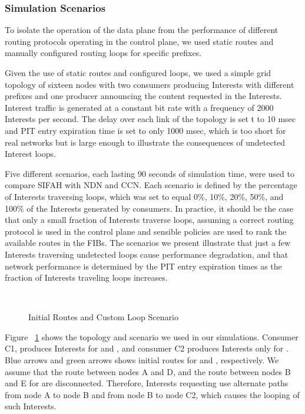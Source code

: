 \documentclass{ancs15-alternate}
\begin{document}
\subsubsection{Simulation Scenarios}

To isolate the operation of the data plane from the performance of different routing protocols operating in the control plane, we used  static routes and  manually configured routing loops for specific prefixes. 

Given the use of static routes and configured loops, we used a simple grid topology of sixteen nodes with two consumers producing Interests with different prefixes and one producer announcing the  content requested in the Interests. Interest traffic is generated at a constant bit rate with a frequency of 2000 Interests per second. The delay over each link of the topology is set t to 10 msec  and PIT entry expiration time is set to only 1000 msec, which is too short for real networks but is large enough to illustrate the consequences of undetected Interest loops.  

Five different scenarios, each lasting  90 seconds of simulation time,
were used to compare SIFAH with NDN and CCN. Each scenario is defined by the percentage of Interests traversing loops, which was set to equal 
0\%, 10\%, 20\%, 50\%, and 100\%  of the Interests generated by consumers.
In practice, it should be the case that  only a small fraction of Interests traverse loops, assuming a correct routing protocol is used in the control plane and sensible policies are used to rank the available routes in the FIBs.
The scenarios we present illustrate that 
just a few Interests traversing undetected loops cause performance degradation, and that network performance is determined by the PIT entry expiration times as the fraction of Interests traveling loops increases.

\begin{figure}[h]
\begin{centering}
    \mbox{
      }
 \vspace{-0.1in}
   \caption{Initial Routes and Custom Loop Scenario}
   \label{loop}
\end{centering} 
\end{figure} 

Figure ~\ref{loop} shows the topology and scenario we used in our simulations. Consumer C1, produces Interests for  and , and consumer C2 produces Interests only for . Blue arrows and green arrows shows initial routes for  and , respectively. We assume that the route between nodes A and D, and the route between nodes B and E for  are disconnected. Therefore, Interests requesting  use alternate paths from node A to node B and from node B to node C2, which causes the looping of such Interests.
\end{document}
